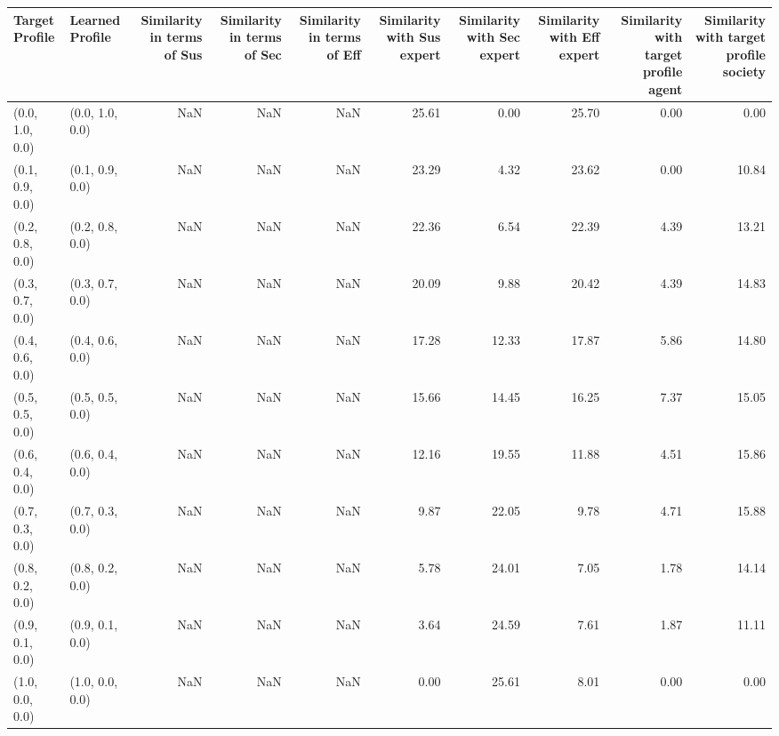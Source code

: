 \begin{tabular}{llrrrrrrrr}
\toprule
Target Profile & Learned Profile & Similarity in terms of Sus & Similarity in terms of Sec & Similarity in terms of Eff & Similarity with Sus expert & Similarity with Sec expert & Similarity with Eff expert & Similarity with target profile agent & Similarity with target profile society \\
\midrule
(0.0, 1.0, 0.0) & (0.0, 1.0, 0.0) & NaN & NaN & NaN & 25.61 & 0.00 & 25.70 & 0.00 & 0.00 \\
(0.1, 0.9, 0.0) & (0.1, 0.9, 0.0) & NaN & NaN & NaN & 23.29 & 4.32 & 23.62 & 0.00 & 10.84 \\
(0.2, 0.8, 0.0) & (0.2, 0.8, 0.0) & NaN & NaN & NaN & 22.36 & 6.54 & 22.39 & 4.39 & 13.21 \\
(0.3, 0.7, 0.0) & (0.3, 0.7, 0.0) & NaN & NaN & NaN & 20.09 & 9.88 & 20.42 & 4.39 & 14.83 \\
(0.4, 0.6, 0.0) & (0.4, 0.6, 0.0) & NaN & NaN & NaN & 17.28 & 12.33 & 17.87 & 5.86 & 14.80 \\
(0.5, 0.5, 0.0) & (0.5, 0.5, 0.0) & NaN & NaN & NaN & 15.66 & 14.45 & 16.25 & 7.37 & 15.05 \\
(0.6, 0.4, 0.0) & (0.6, 0.4, 0.0) & NaN & NaN & NaN & 12.16 & 19.55 & 11.88 & 4.51 & 15.86 \\
(0.7, 0.3, 0.0) & (0.7, 0.3, 0.0) & NaN & NaN & NaN & 9.87 & 22.05 & 9.78 & 4.71 & 15.88 \\
(0.8, 0.2, 0.0) & (0.8, 0.2, 0.0) & NaN & NaN & NaN & 5.78 & 24.01 & 7.05 & 1.78 & 14.14 \\
(0.9, 0.1, 0.0) & (0.9, 0.1, 0.0) & NaN & NaN & NaN & 3.64 & 24.59 & 7.61 & 1.87 & 11.11 \\
(1.0, 0.0, 0.0) & (1.0, 0.0, 0.0) & NaN & NaN & NaN & 0.00 & 25.61 & 8.01 & 0.00 & 0.00 \\
\bottomrule
\end{tabular}
